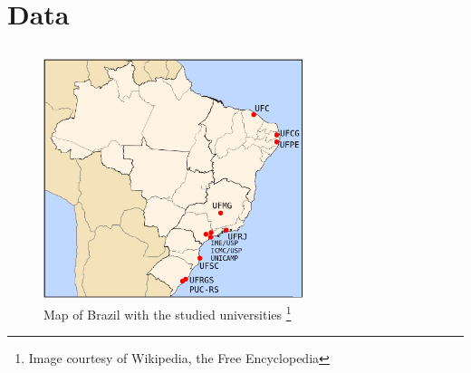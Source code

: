 \documentclass{beamer}
\begin{document}
\section{Data}
\subsection{}

\begin{frame}
\begin{figure}[htp]
\begin{center}
  \includegraphics[height=7cm]{brazil_map.png}
  \caption[map]{Map of Brazil with the studied universities \footnote{\tiny
  Image courtesy of Wikipedia, the Free Encyclopedia}}
\end{center}
\end{figure}

\end{frame}
\end{document}
